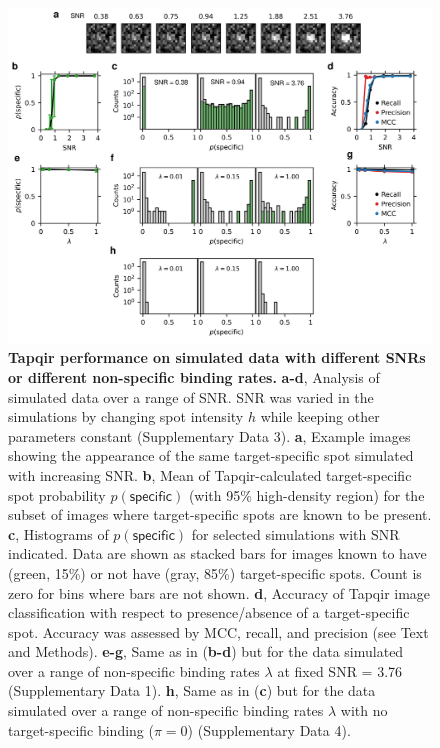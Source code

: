 \begin{figure}[h]
\centering
\includegraphics[width=1\textwidth]{figures/figure5/figure5.png}
\caption{\textbf{Tapqir performance on simulated data with different SNRs or different non-specific binding rates.} \textbf{a-d}, Analysis of simulated data over a range of SNR. SNR was varied in the simulations by changing spot intensity  $h$ while keeping other parameters constant (Supplementary Data 3). \textbf{a}, Example images showing the appearance of the same target-specific spot simulated with increasing SNR.   \textbf{b}, Mean of Tapqir-calculated target-specific spot probability $p(\mathsf{specific})$ (with 95\% high-density region) for the subset of images where target-specific spots  are known to be present. \textbf{c}, Histograms of $p(\mathsf{specific})$ for selected simulations with SNR indicated. Data are shown as stacked bars for images known to have (green, 15\%) or not have (gray, 85\%) target-specific spots.  Count is zero for bins where bars are not shown. \textbf{d}, Accuracy of Tapqir image classification with respect to presence/absence of a target-specific spot. Accuracy was assessed by MCC, recall, and precision (see Text and Methods). \textbf{e-g}, Same as in (\textbf{b-d}) but for the data simulated over a range of non-specific binding rates $\lambda$ at fixed SNR = 3.76 (Supplementary Data 1). \textbf{h}, Same as in (\textbf{c}) but for the data simulated over a range of non-specific binding rates $\lambda$ with no target-specific binding ($\pi = 0$) (Supplementary Data 4).}
\label{fig:tapqir_performance}
\end{figure}

